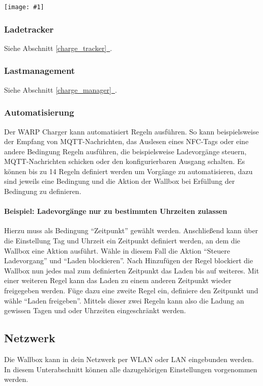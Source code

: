 \documentclass[a4paper,10pt]{article}
\newcommand{\gfx}[1]{\texttt{[image: \#1]}}
\newcommand*{\fullref}[1]{Abschnitt \hyperref[{#1}]{\ref*{#1}~\nameref*{#1}}}
\begin{document}
\begin{multicols*}{2}
    \gfx{./img_warp2/resized/web_meter}

    \vspace{-0.4cm}
    \subsubsection{Ladetracker}
    Siehe \fullref{charge_tracker}.
    \vspace{-0.2cm}
    \subsubsection{Lastmanagement}
    Siehe \fullref{charge_manager}.
     \vspace{-0.2cm}
    \subsubsection{Automatisierung}
    Der WARP Charger kann automatisiert Regeln ausführen. So kann beispielsweise
    der Empfang von MQTT-Nachrichten, das Auslesen eines NFC-Tags oder eine andere Bedingung
    Regeln ausführen, die beispielsweise Ladevorgänge steuern, MQTT-Nachrichten schicken oder
    den konfigurierbaren Ausgang schalten.
    Es können bis zu 14 Regeln definiert werden um Vorgänge zu automatisieren,
    dazu sind jeweils eine Bedingung und die Aktion der Wallbox bei Erfüllung der
    Bedingung zu definieren.

    \paragraph{Beispiel: Ladevorgänge nur zu bestimmten Uhrzeiten zulassen}
    Hierzu muss als Bedingung \enquote{Zeitpunkt} gewählt werden. Anschließend
    kann über die Einstellung Tag und Uhrzeit ein Zeitpunkt definiert werden, an
    dem die Wallbox eine Aktion ausführt. Wähle in diesem Fall die Aktion
    \enquote{Steuere Ladevorgang} und \enquote{Laden blockieren}. Nach
    Hinzufügen der Regel blockiert die Wallbox nun jedes mal zum definierten
    Zeitpunkt das Laden bis auf weiteres. Mit einer weiteren Regel kann
    das Laden zu einem anderen Zeitpunkt wieder freigegeben werden. Füge dazu
    eine zweite Regel ein, definiere den Zeitpunkt und wähle
    \enquote{Laden freigeben}. Mittels dieser zwei Regeln kann also die Ladung
    an gewissen Tagen und oder Uhrzeiten eingeschränkt werden.

    \subsection{Netzwerk}\label{network}
    Die Wallbox kann in dein Netzwerk per WLAN oder LAN eingebunden werden.
    In diesem Unterabschnitt können alle dazugehörigen Einstellungen vorgenommen werden.


\end{multicols*}
\end{document}
